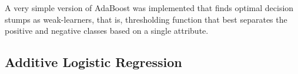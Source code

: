 \documentclass[10pt,conference,compsocconf]{IEEEtran}
\begin{document}
A very simple version of AdaBoost was implemented that finds optimal decision stumps as weak-learners, that is, thresholding function that best separates the positive and negative classes based on a single attribute.
\subsection{Additive Logistic Regression \cite{friedman98}}
\label{sec:orgheadline10}




\printbibliography
\end{document}

